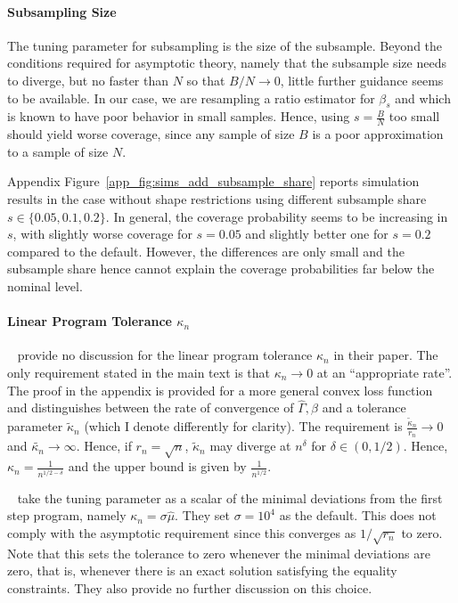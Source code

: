\documentclass[12pt,a4paper,english]{article} %
\numberwithin{equation}{section}
\theoremstyle{definition}
\theoremstyle{remark}
\theoremstyle{plain}
\begin{document}
\paragraph{Subsampling Size}
The tuning parameter for subsampling is the size of the subsample.
Beyond the conditions required for asymptotic theory, namely that the subsample size needs to diverge, but no faster than $N$ so that $B/N \to 0$, little further guidance seems to be available.
In our case, we are resampling a ratio estimator for $\beta_s$ and which is known to have poor behavior in small samples.
Hence, using $s = \frac{B}{N}$ too small should yield worse coverage, since any sample of size $B$ is a poor approximation to a sample of size $N$.

Appendix Figure~\ref{app_fig:sims_add_subsample_share} reports simulation results in the case without shape restrictions using different subsample share $s \in \{0.05, 0.1, 0.2\}$.
In general, the coverage probability seems to be increasing in $s$, with slightly worse coverage for $s=0.05$ and slightly better one for $s=0.2$ compared to the default.
However, the differences are only small and the subsample share hence cannot explain the coverage probabilities far below the nominal level.

\paragraph{Linear Program Tolerance $\kappa_n$}
~\cite{mogstad2018using} provide no discussion for the linear program tolerance $\kappa_n$ in their paper.
The only requirement stated in the main text is that $\kappa_n \to 0$ at an ``appropriate rate''.
The proof in the appendix is provided for a more general convex loss function and distinguishes between the rate of convergence of $\hat{\Gamma}, \hat{\beta}$ and a tolerance parameter $\tilde{\kappa}_n$ (which I denote differently for clarity).
The requirement is $\frac{\tilde{\kappa}_n}{r_n} \to 0$ and $\tilde{\kappa_n}\to \infty$. Hence, if $r_n = \sqrt{n}$, $\tilde{\kappa}_n$ may diverge at $n^\delta$ for $\delta \in (0, 1/2)$.
Hence, $\kappa_n = \frac{1}{n^{1/2 - \delta}}$ and the upper bound is given by $\frac{1}{n^{1/2}}$.

~\cite{shea2023ivmte} take the tuning parameter as a scalar of the minimal deviations from the first step program, namely $\kappa_n = \sigma \hat{\mu}$. They set $\sigma = 10^4$ as the default.
This does not comply with the asymptotic requirement since this converges as $1/\sqrt{r_n}$ to zero.
Note that this sets the tolerance to zero whenever the minimal deviations are zero, that is, whenever there is an exact solution satisfying the equality constraints.
They also provide no further discussion on this choice.
\end{document}
